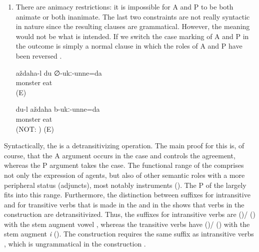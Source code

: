 \begin{enumerate}
	\item	There are animacy restrictions: it is impossible for A and P to be both animate or both inanimate. The last two constraints are not really syntactic in nature since the resulting clauses are grammatical. However, the meaning would not be what is intended. If we switch the case marking of A and P in  the outcome is simply a normal clause in which the roles of A and P have been reversed . 
	\begin{exe}
		\ex	\label{ex:The monster and me are eating each other}
		\begin{xlist}
			\ex	\label{ex:The monster is eating me}
			\gll	aždaha-l	du	∅-ukː-unne=da\\
				monster		eat\\
			\glt	{} (E)
	
			\ex	\label{ex:I am eating the monster.}
			\gll	du-l	aždaha	b-ukː-unne=da\\
					monster	eat\\
			\glt	{} (NOT: ) (E)
		\end{xlist}
	\end{exe}
\end{enumerate}

Syntactically, the  is a detransitivizing operation. The main proof for this is, of course, that the A argument occurs in the  case and controls the  agreement, whereas the P argument takes the  case. The functional range of the  comprises not only the expression of agents, but also of other semantic roles with a more peripheral status (adjuncts), most notably instruments (). The  P of the  largely fits into this range. Furthermore, the distinction between suffixes for intransitive and for transitive verbs that is made in the  and in the  shows that verbs in the  construction are detransitivized. Thus, the  suffixes for intransitive verbs are  ()\slash{} () with the stem augment vowel , whereas the transitive verbs have  ()\slash{} () with the stem augment \textit{i} (). The  construction requires the same  suffix as intransitive verbs , which is ungrammatical in the  construction .

